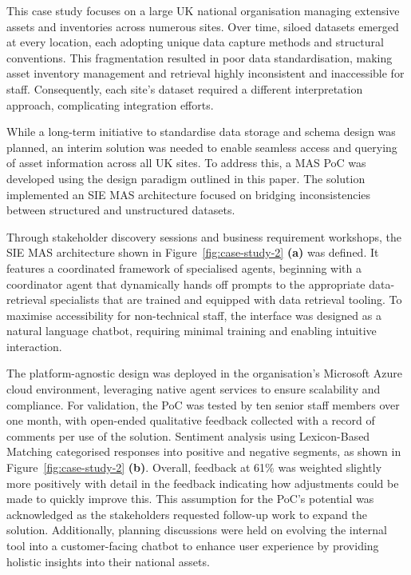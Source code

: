 \documentclass{article}
\begin{document}
This case study focuses on a large UK national organisation managing extensive assets and inventories across numerous sites. Over time, siloed datasets emerged at every location, each adopting unique data capture methods and structural conventions. This fragmentation resulted in poor data standardisation, making asset inventory management and retrieval highly inconsistent and inaccessible for staff. Consequently, each site’s dataset required a different interpretation approach, complicating integration efforts.

While a long-term initiative to standardise data storage and schema design was planned, an interim solution was needed to enable seamless access and querying of asset information across all UK sites. To address this, a MAS PoC was developed using the design paradigm outlined in this paper. The solution implemented an SIE MAS architecture focused on bridging inconsistencies between structured and unstructured datasets.

Through stakeholder discovery sessions and business requirement workshops, the SIE MAS architecture shown in Figure~\ref{fig:case-study-2} \textbf{(a)} was defined. It features a coordinated framework of specialised agents, beginning with a coordinator agent that dynamically hands off prompts to the appropriate data-retrieval specialists that are trained and equipped with data retrieval tooling. To maximise accessibility for non-technical staff, the interface was designed as a natural language chatbot, requiring minimal training and enabling intuitive interaction.

The platform-agnostic design was deployed in the organisation’s Microsoft Azure cloud environment, leveraging native agent services to ensure scalability and compliance. For validation, the PoC was tested by ten senior staff members over one month, with open-ended qualitative feedback collected with a record of comments per use of the solution. Sentiment analysis using Lexicon-Based Matching \cite{inproceedings2019jennifer} categorised responses into positive and negative segments, as shown in Figure~\ref{fig:case-study-2} \textbf{(b)}. Overall, feedback at 61\% was weighted slightly more positively with detail in the feedback indicating how adjustments could be made to quickly improve this. This assumption for the PoC's potential was acknowledged as the stakeholders requested follow-up work to expand the solution. Additionally, planning discussions were held on evolving the internal tool into a customer-facing chatbot to enhance user experience by providing holistic insights into their national assets.
\end{document}
